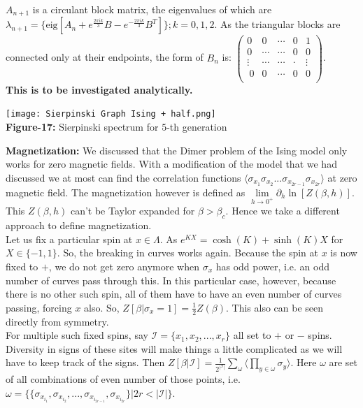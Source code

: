 \documentclass{article}
\begin{document}
	$A_{n+1}$ is a circulant block matrix, the eigenvalues of which are $\lambda_{n+1} = \{\text{eig}[ A_n+e^{\frac{2\pi i k}{3}}B-e^{-\frac{2 \pi i k}{3}}B^T]\}; k=0,1,2$. As the triangular blocks are connected only at their endpoints, the form of $B_n$ is:
	$\begin{pmatrix}
		0&0&\cdots&0&1\\
		0&\cdots&\cdots&0&0\\
		\vdots&\cdots&\cdots&\cdot&\vdots\\\
		0&0&\cdots&0&0\\
	\end{pmatrix}$. \\
	
	\textbf{This is to be investigated analytically.}
	
	\begin{center}
		\texttt{[image: Sierpinski Graph Ising + half.png]}\\
		\textbf{Figure-17:} Sierpinski spectrum for $5$-th generation \\
	\end{center}
	
	\textbf{Magnetization:} We discussed that the Dimer problem of the Ising model only works for zero magnetic fields. With a modification of the model that we had discussed we at most can find the correlation functions $\langle \sigma_{x_1}\sigma_{x_2}...\sigma_{x_{2r-1}}\sigma_{x_{2r}}\rangle$ at zero magnetic field. The magnetization however is defined as $\lim\limits_{h \to 0^{+}} \partial_h \ln[Z(\beta, h)]$. This $Z(\beta,h)$ can't be Taylor expanded for $\beta >\beta_c$. Hence we take a different approach to define magnetization. \\
	
	Let us fix a particular spin at $x \in \Lambda$. As $e^{KX}=\cosh(K)+\sinh(K)X$ for $X \in \{-1,1\}$. So, the breaking in curves works again. Because the spin at $x$ is now fixed to $+$, we do not get zero anymore when $\sigma_x$ has odd power, i.e. an odd number of curves pass through this. In this particular case, however, because there is no other such spin, all of them have to have an even number of curves passing, forcing $x$ also. So,  $Z[\beta | \sigma_x=1]=\frac{1}{2}Z(\beta)$. This also can be seen directly from symmetry. \\
	
	For multiple such fixed spins, say $\mathcal I= \{x_1,x_2,...,x_r\}$ all set to $+$ or $-$ spins. Diversity in signs of these sites will make things a little complicated as we will have to keep track of the signs. Then $Z[\beta | \mathcal I]=\frac{1}{2^{|\mathcal I|}}\sum_{\omega} \langle \prod_{y \in \omega} \sigma_y \rangle$. Here $\omega$ are set of all combinations of even number of those points, i.e. $\omega=\{\{\sigma_{x_{i_1}},\sigma_{x_{i_2}},...,\sigma_{x_{i_{2r-1}}},\sigma_{x_{i_{2r}}}\} | 2r<|\mathcal I|\}$.\\ 
	
\end{document}
